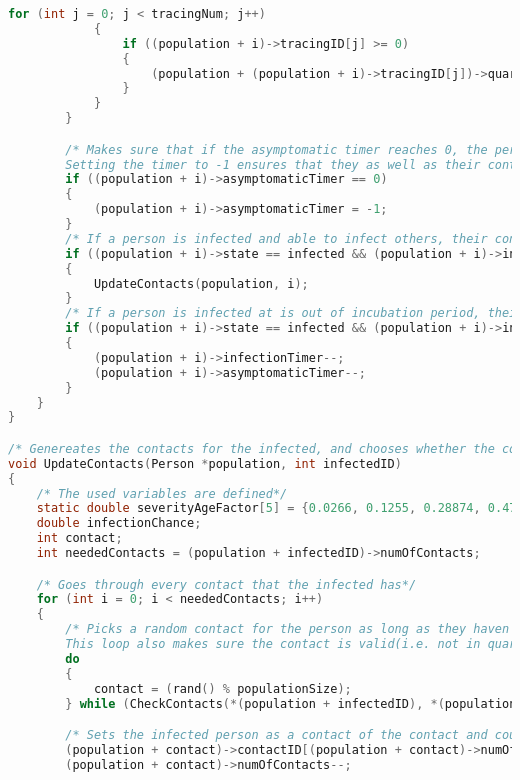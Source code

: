 \begin{lstlisting}[language=c, caption={Our simulations written in c}, captionpos=b, label={snippet:LABELNAVN}]
            for (int j = 0; j < tracingNum; j++)
            {
                if ((population + i)->tracingID[j] >= 0)
                {
                    (population + (population + i)->tracingID[j])->quarantine = true;
                }
            }
        }

        /* Makes sure that if the asymptomatic timer reaches 0, the person is no longer symptomatic. 
        Setting the timer to -1 ensures that they as well as their contacts dont end up in quarantine multiple times because of contact tracing*/
        if ((population + i)->asymptomaticTimer == 0)
        {
            (population + i)->asymptomaticTimer = -1;
        }
        /* If a person is infected and able to infect others, their contacts are updated*/
        if ((population + i)->state == infected && (population + i)->incubation == false && (population + i)->quarantine == false)
        {
            UpdateContacts(population, i);
        }
        /* If a person is infected at is out of incubation period, their asymptomatic timer and infection timer is ticked down*/
        if ((population + i)->state == infected && (population + i)->incubation == false)
        {
            (population + i)->infectionTimer--;
            (population + i)->asymptomaticTimer--;
        }
    }
}

/* Genereates the contacts for the infected, and chooses whether the contact will be infected or not */
void UpdateContacts(Person *population, int infectedID)
{
    /* The used variables are defined*/
    static double severityAgeFactor[5] = {0.0266, 0.1255, 0.28874, 0.4707, 0.41935};
    double infectionChance;
    int contact;
    int neededContacts = (population + infectedID)->numOfContacts;

    /* Goes through every contact that the infected has*/
    for (int i = 0; i < neededContacts; i++)
    {
        /* Picks a random contact for the person as long as they haven't gotten number of contacts they need already.
        This loop also makes sure the contact is valid(i.e. not in quarantine, deceased, etc.)*/
        do
        {
            contact = (rand() % populationSize);
        } while (CheckContacts(*(population + infectedID), *(population + contact), contact));

        /* Sets the infected person as a contact of the contact and counts down their number of contacts*/
        (population + contact)->contactID[(population + contact)->numOfContacts] = (population + infectedID)->ID;
        (population + contact)->numOfContacts--;


\end{lstlisting}
